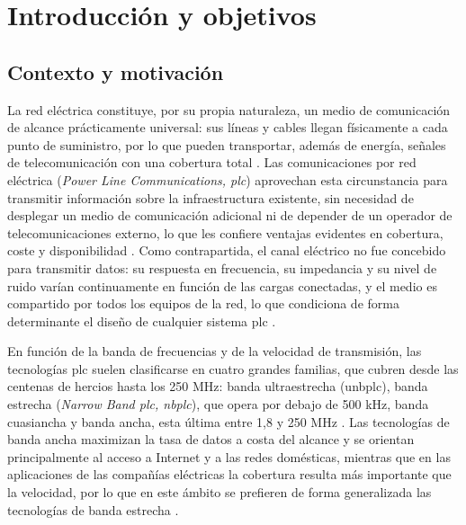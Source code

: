 \chapter{Introducción y objetivos}
\label{ch:introduccion}

\section{Contexto y motivación}
\label{sec:contexto_motivacion}

La red eléctrica constituye, por su propia naturaleza, un medio de comunicación de alcance prácticamente universal: sus líneas y cables llegan físicamente a cada punto de suministro, por lo que pueden transportar, además de energía, señales de telecomunicación con una cobertura total \cite{5764444}. Las comunicaciones por red eléctrica (\textit{Power Line Communications, \gls{plc}}) aprovechan esta circunstancia para transmitir información sobre la infraestructura existente, sin necesidad de desplegar un medio de comunicación adicional ni de depender de un operador de telecomunicaciones externo, lo que les confiere ventajas evidentes en cobertura, coste y disponibilidad \cite{5764443}. Como contrapartida, el canal eléctrico no fue concebido para transmitir datos: su respuesta en frecuencia, su impedancia y su nivel de ruido varían continuamente en función de las cargas conectadas, y el medio es compartido por todos los equipos de la red, lo que condiciona de forma determinante el diseño de cualquier sistema \gls{plc} \cite{5764443, SHARMA2017704}.

En función de la banda de frecuencias y de la velocidad de transmisión, las tecnologías \gls{plc} suelen clasificarse en cuatro grandes familias, que cubren desde las centenas de hercios hasta los 250 MHz: banda ultraestrecha (\gls{unbplc}), banda estrecha (\textit{Narrow Band \gls{plc}, \gls{nbplc}}), que opera por debajo de 500 kHz, banda cuasiancha y banda ancha, esta última entre 1,8 y 250 MHz \cite{SHARMA2017704}. Las tecnologías de banda ancha maximizan la tasa de datos a costa del alcance y se orientan principalmente al acceso a Internet y a las redes domésticas, mientras que en las aplicaciones de las compañías eléctricas la cobertura resulta más importante que la velocidad, por lo que en este ámbito se prefieren de forma generalizada las tecnologías de banda estrecha \cite{5764444}.

